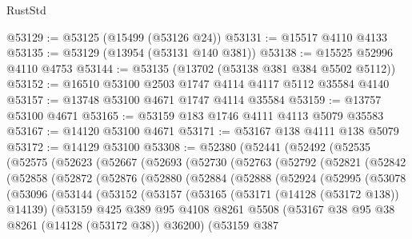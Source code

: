 \begin{lexlean}{RustStd}
\begin{coremodule}
@53129 := @53125 (@15499 (@53126 @24))
@53131 := @15517 @4110 @4133
@53135 := @53129 (@13954 (@53131 @140 @381))
@53138 := @15525 @52996 @4110 @4753
@53144 := @53135 (@13702 (@53138 @381 @384 @5502 @5112))
@53152 := @16510 @53100 @2503 @1747 @4114 @4117 @5112 @35584 @4140
@53157 := @13748 @53100 @4671 @1747 @4114 @35584
@53159 := @13757 @53100 @4671
@53165 := @53159 @183 @1746 @4111 @4113 @5079 @35583
@53167 := @14120 @53100 @4671
@53171 := @53167 @138 @4111 @138 @5079
@53172 := @14129 @53100
@53308 := @52380
    (@52441
      (@52492
        (@52535
          (@52575
            (@52623
              (@52667
                (@52693
                  (@52730
                    (@52763
                      (@52792
                        (@52821
                          (@52842
                            (@52858
                              (@52872
                                (@52876
                                  (@52880
                                    (@52884
                                      (@52888
                                        (@52924
                                          (@52995
                                            (@53078
                                              (@53096
                                                (@53144
                                                  (@53152
                                                    (@53157
                                                      (@53165
                                                        (@53171 (@14128 (@53172 @138)) @14139)
                                                        (@53159
                                                          @425
                                                          @389
                                                          @95
                                                          @4108
                                                          @8261
                                                          @5508
                                                          (@53167
                                                            @38
                                                            @95
                                                            @38
                                                            @8261
                                                            (@14128 (@53172 @38))
                                                            @36200)
                                                          (@53159
                                                            @387

\end{coremodule}
\end{lexlean}
